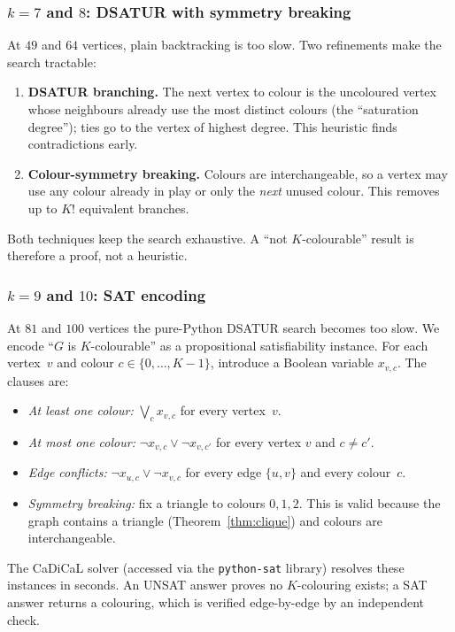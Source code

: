 \documentclass[12pt]{article}
\theoremstyle{definition}
\theoremstyle{remark}
\begin{document}
\subsubsection*{$k = 7$ and $8$: DSATUR with symmetry breaking}

At $49$ and $64$ vertices, plain backtracking is too slow.
Two refinements make the search tractable:
\begin{enumerate}
  \item \textbf{DSATUR branching.}  The next vertex to colour is the
    uncoloured vertex whose neighbours already use the most distinct
    colours (the ``saturation degree''); ties go to the vertex of highest
    degree.  This heuristic finds contradictions early.
  \item \textbf{Colour-symmetry breaking.}  Colours are interchangeable,
    so a vertex may use any colour already in play or only the \emph{next}
    unused colour.  This removes up to $K!$ equivalent branches.
\end{enumerate}
Both techniques keep the search exhaustive.  A ``not $K$-colourable''
result is therefore a proof, not a heuristic.

\subsubsection*{$k = 9$ and $10$: SAT encoding}

At $81$ and $100$ vertices the pure-Python DSATUR search becomes too slow.
We encode ``$G$ is $K$-colourable'' as a propositional satisfiability
instance.  For each vertex~$v$ and colour $c \in \{0, \ldots, K{-}1\}$,
introduce a Boolean variable $x_{v,c}$.  The clauses are:
\begin{itemize}
  \item \emph{At least one colour:} $\bigvee_c x_{v,c}$ for every vertex~$v$.
  \item \emph{At most one colour:} $\neg x_{v,c} \lor \neg x_{v,c'}$ for
    every vertex $v$ and $c \ne c'$.
  \item \emph{Edge conflicts:} $\neg x_{u,c} \lor \neg x_{v,c}$ for every
    edge $\{u,v\}$ and every colour~$c$.
  \item \emph{Symmetry breaking:} fix a triangle to colours $0, 1, 2$.
    This is valid because the graph contains a triangle
    (Theorem~\ref{thm:clique}) and colours are interchangeable.
\end{itemize}
The CaDiCaL solver (accessed via the \texttt{python-sat} library) resolves
these instances in seconds.  An UNSAT answer proves no $K$-colouring exists;
a SAT answer returns a colouring, which is verified edge-by-edge by an
independent check.
\end{document}
